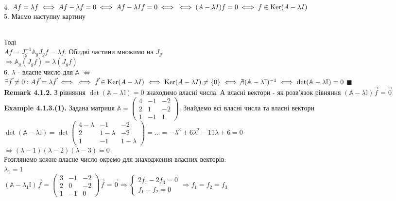\documentclass[a4paper, 14pt]{extarticle}
\def\ex#1{\textbf{Example {#1}}}
\def\rm#1{\textbf{Remark {#1}}}
\def\bigline{\vspace{5mm}\\}
\def\qed{$\blacksquare$}
\begin{document}
\bigline
4. $Af = \lambda f \iff Af - \lambda f = 0 \iff Af - \lambda If = 0 \iff \\ \iff (A-\lambda I)f = 0 \iff f \in \textrm{Ker}(A - \lambda I)$\bigline
5. Маємо наступну картину\\
\\
Тоді\\
$Af = J_g^{-1} \mathbb{A}_g J_g f = \lambda f$. Обидві частини множимо на $J_g$\\
$\Rightarrow \mathbb{A}_g (J_g f) = \lambda (J_g f)$
\bigline
6. $\lambda$ - власне число для $\mathbb{A}$ $\iff$ $\exists \vec{f} \neq 0: A \vec{f} = \lambda \vec{f} \iff \\ \iff \vec{f} \in \textrm{Ker} (A-\lambda I) \iff \textrm{Ker} (A-\lambda I) \neq \{0\} \iff \not\exists (\mathbb{A} - \lambda \mathbb{I})^{-1} \iff \det (\mathbb{A} - \lambda \mathbb{I}) = 0$ \qed \bigline
\rm{4.1.2.} З рівняння $\det (\mathbb{A} - \lambda \mathbb{I}) = 0$ знаходимо власні числа. А власні вектори - як розв'язок рівняння $(\mathbb{A} - \lambda \mathbb{I})\vec{f} = \vec{0}$ \bigline
\ex{4.1.3.(1).} Задана матриця $\mathbb{A} = \begin{pmatrix}
4 & -1 & -2 \\
2 & 1 & -2 \\
1 & -1 & 1
\end{pmatrix}$. Знайдемо всі власні числа та власні вектори\\
$\det (\mathbb{A} - \lambda \mathbb{I}) = \det \begin{pmatrix}
4-\lambda & -1 & -2 \\
2 & 1-\lambda & -2 \\
1 & -1 & 1-\lambda
\end{pmatrix} = \dots = -\lambda^3 + 6 \lambda^2 - 11 \lambda + 6 = 0$\\
$\Rightarrow (\lambda - 1)(\lambda -2)(\lambda - 3) = 0$\\
Розглянемо кожне власне число окремо для знаходження власних векторів:\\
$\lambda_1 = 1$\\
$(\mathbb{A} - \lambda_1 \mathbb{I})\vec{f} =\begin{pmatrix}
3 & -1 & -2 \\
2 & 0 & -2 \\
1 & -1 & 0
\end{pmatrix} \vec{f} = \vec{0} \Rightarrow \begin{cases} 2f_1 - 2f_3 = 0 \\ f_1 - f_2 = 0 \end{cases} \Rightarrow f_1 = f_2 = f_3$\\
\end{document}
